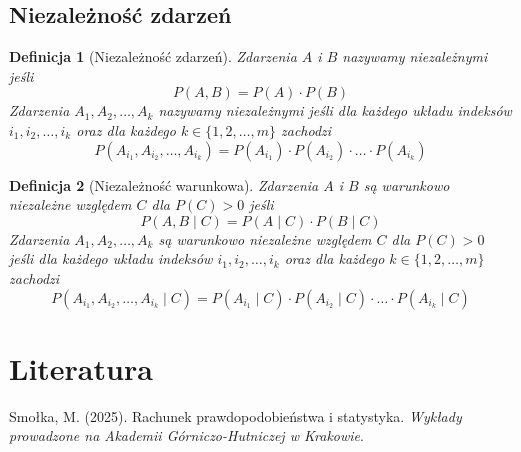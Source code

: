 \documentclass[11pt, leqno]{scrartcl}
\theoremstyle{mydefinition}
\newtheorem{definition}{Definicja}[subsection]
\theoremstyle{mytheorem}
\begin{document}
    \subsection{Niezależność zdarzeń}
    \begin{definition}[Niezależność zdarzeń]
        Zdarzenia $A$ i $B$ nazywamy niezależnymi jeśli
        \[
            P(A,B)=P(A) \cdot P(B)
        \]
        Zdarzenia $A_1,A_2,\ldots,A_k$ nazywamy niezależnymi jeśli dla
        każdego układu indeksów $i_1,i_2,\ldots,i_k$ oraz dla każdego
        $k \in \{1,2,\ldots,m\}$ zachodzi
        \[
            P(A_{i_1},A_{i_2},\ldots,A_{i_k})=P(A_{i_1}) \cdot
            P(A_{i_2}) \cdot \ldots \cdot P(A_{i_k})
        \]
    \end{definition}
    \begin{definition}[Niezależność warunkowa]
        Zdarzenia $A$ i $B$ są warunkowo niezależne względem $C$
        dla $P(C)>0$ jeśli
        \[
            P(A,B \mid C)=P(A \mid C) \cdot P(B \mid C)
        \]
        Zdarzenia $A_1,A_2,\ldots,A_k$ są warunkowo niezależne względem $C$ dla
        $P(C)>0$ jeśli dla każdego układu indeksów $i_1,i_2,\ldots,i_k$ oraz dla
        każdego $k \in \{1,2,\ldots,m\}$ zachodzi
        \[
            P(A_{i_1},A_{i_2},\ldots,A_{i_k} \mid C)=P(A_{i_1} \mid C) \cdot
            P(A_{i_2} \mid C) \cdot \ldots \cdot P(A_{i_k} \mid C)
        \]
    \end{definition}

    \section{Literatura}
    \begin{thebibliography}{9}
         Smołka, M. (2025). Rachunek prawdopodobieństwa
        i statystyka. \textit{Wykłady prowadzone na Akademii Górniczo-Hutniczej
        w Krakowie}.
    \end{thebibliography}
\end{document}

